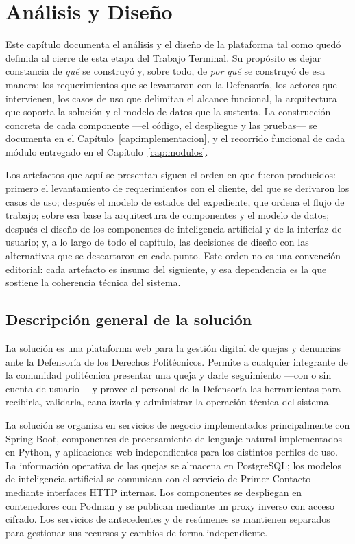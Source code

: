 \chapter{Análisis y Diseño}
	\label{cap:analisis_diseno}
	Este capítulo documenta el análisis y el diseño de la plataforma tal como quedó definida al
	cierre de esta etapa del Trabajo Terminal. Su propósito es dejar constancia de \emph{qué} se
	construyó y, sobre todo, de \emph{por qué} se construyó de esa manera: los requerimientos que
	se levantaron con la Defensoría, los actores que intervienen, los casos de uso que delimitan
	el alcance funcional, la arquitectura que soporta la solución y el modelo de datos que la
	sustenta. La construcción concreta de cada componente ---el código, el despliegue y las
	pruebas--- se documenta en el Capítulo~\ref{cap:implementacion}, y el recorrido funcional de
	cada módulo entregado en el Capítulo~\ref{cap:modulos}.
	
	Los artefactos que aquí se presentan siguen el orden en que fueron producidos: primero el
	levantamiento de requerimientos con el cliente, del que se derivaron los casos de uso; después
	el modelo de estados del expediente, que ordena el flujo de trabajo; sobre esa base la
	arquitectura de componentes y el modelo de datos; después el diseño de los componentes de
	inteligencia artificial y de la interfaz de usuario; y, a lo largo de todo el capítulo, las
	decisiones de diseño con las alternativas que se descartaron en cada punto. Este orden no es una convención editorial:
	cada artefacto es insumo del siguiente, y esa dependencia es la que sostiene la coherencia
	técnica del sistema.
	
	\section{Descripción general de la solución}
	\label{sec:descripcion_solucion}
	La solución es una plataforma web para la gestión digital de quejas y denuncias ante la
	Defensoría de los Derechos Politécnicos. Permite a cualquier integrante de la comunidad
	politécnica presentar una queja y darle seguimiento ---con o sin cuenta de usuario--- y provee
	al personal de la Defensoría las herramientas para recibirla, validarla, canalizarla y
	administrar la operación técnica del sistema.
	
	La solución se organiza en servicios de negocio implementados principalmente con Spring Boot,
	componentes de procesamiento de lenguaje natural implementados en Python, y aplicaciones web
	independientes para los distintos perfiles de uso. La información operativa de las quejas se
	almacena en PostgreSQL; los modelos de inteligencia artificial se comunican con el servicio de
	Primer Contacto mediante interfaces HTTP internas. Los componentes se despliegan en contenedores
	con Podman y se publican mediante un proxy inverso con acceso cifrado. Los servicios de
	antecedentes y de resúmenes se mantienen separados para gestionar sus recursos y cambios de
	forma independiente.
	
